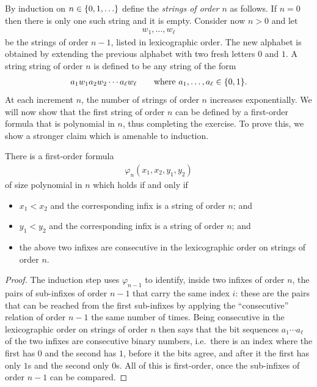 {
By induction on  $n \in \{0,1,\ldots\}$ define the \emph{strings of order $n$} as follows. If $n=0$ then there is only one such string and it is empty. Consider now $n>0$ and let 
    \begin{align*}
    w_1,\ldots,w_\ell
    \end{align*}
    be the strings of order $n-1$, listed in lexicographic order.  The new alphabet is obtained by extending the previous alphabet with two fresh letters $0$ and $1$. A string  string of order $n$ is defined to be any string of the form 
    \begin{align*}
    a_1 w_1 a_2 w_2 \cdots a_\ell w_\ell  \qquad \text{where $a_1,\ldots,a_\ell \in \{0,1\}$}.
    \end{align*}
    At each increment $n$, the number of strings of order $n$ increases exponentially. We will now show that the first string of order $n$ can be defined by a first-order formula that is polynomial in $n$, thus completing the exercise. To prove this, we show a stronger claim which is amenable to induction. 
    \begin{claim}\label{lem:fo-non-elementary-order}
        There is a first-order formula 
        \begin{align*}
            \varphi_n(x_1,x_2,y_1,y_2)
        \end{align*}
        of size polynomial in $n$ which holds if and only if
        \begin{itemize}
            \item $x_1 < x_2$ and the corresponding infix is a string of order $n$; and 
            \item $y_1 < y_2$ and the corresponding infix is a string of order $n$; and
            \item the  above two infixes  are consecutive in the lexicographic order on strings of order $n$.
        \end{itemize}
    \end{claim}
    \begin{proof}
        The induction step uses $\varphi_{n-1}$ to identify, inside two infixes of order $n$, the pairs of sub-infixes of order $n-1$ that carry the same index $i$: these are the pairs that can be reached from the first sub-infixes by applying the ``consecutive'' relation of order $n-1$ the same number of times. Being consecutive in the lexicographic order on strings of order $n$ then says that the bit sequences $a_1 \cdots a_\ell$ of the two infixes are consecutive binary numbers, i.e.~there is an index where the first has $0$ and the second has $1$, before it the bits agree, and after it the first has only $1$s and the second only $0$s. All of this is first-order, once the sub-infixes of order $n-1$ can be compared.


\end{proof}}
